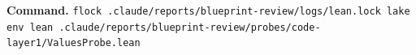 \textbf{Command.} \texttt{f\allowbreak{}l\allowbreak{}o\allowbreak{}c\allowbreak{}k\allowbreak{} .\allowbreak{}c\allowbreak{}l\allowbreak{}a\allowbreak{}u\allowbreak{}d\allowbreak{}e\allowbreak{}/\allowbreak{}r\allowbreak{}e\allowbreak{}p\allowbreak{}o\allowbreak{}r\allowbreak{}t\allowbreak{}s\allowbreak{}/\allowbreak{}b\allowbreak{}l\allowbreak{}u\allowbreak{}e\allowbreak{}p\allowbreak{}r\allowbreak{}i\allowbreak{}n\allowbreak{}t\allowbreak{}-{}\allowbreak{}r\allowbreak{}e\allowbreak{}v\allowbreak{}i\allowbreak{}e\allowbreak{}w\allowbreak{}/\allowbreak{}l\allowbreak{}o\allowbreak{}g\allowbreak{}s\allowbreak{}/\allowbreak{}l\allowbreak{}e\allowbreak{}a\allowbreak{}n\allowbreak{}.\allowbreak{}l\allowbreak{}o\allowbreak{}c\allowbreak{}k\allowbreak{} l\allowbreak{}a\allowbreak{}k\allowbreak{}e\allowbreak{} e\allowbreak{}n\allowbreak{}v\allowbreak{} l\allowbreak{}e\allowbreak{}a\allowbreak{}n\allowbreak{} .\allowbreak{}c\allowbreak{}l\allowbreak{}a\allowbreak{}u\allowbreak{}d\allowbreak{}e\allowbreak{}/\allowbreak{}r\allowbreak{}e\allowbreak{}p\allowbreak{}o\allowbreak{}r\allowbreak{}t\allowbreak{}s\allowbreak{}/\allowbreak{}b\allowbreak{}l\allowbreak{}u\allowbreak{}e\allowbreak{}p\allowbreak{}r\allowbreak{}i\allowbreak{}n\allowbreak{}t\allowbreak{}-{}\allowbreak{}r\allowbreak{}e\allowbreak{}v\allowbreak{}i\allowbreak{}e\allowbreak{}w\allowbreak{}/\allowbreak{}p\allowbreak{}r\allowbreak{}o\allowbreak{}b\allowbreak{}e\allowbreak{}s\allowbreak{}/\allowbreak{}c\allowbreak{}o\allowbreak{}d\allowbreak{}e\allowbreak{}-{}\allowbreak{}l\allowbreak{}a\allowbreak{}y\allowbreak{}e\allowbreak{}r\allowbreak{}1\allowbreak{}/\allowbreak{}V\allowbreak{}a\allowbreak{}l\allowbreak{}u\allowbreak{}e\allowbreak{}s\allowbreak{}P\allowbreak{}r\allowbreak{}o\allowbreak{}b\allowbreak{}e\allowbreak{}.\allowbreak{}l\allowbreak{}e\allowbreak{}a\allowbreak{}n}

